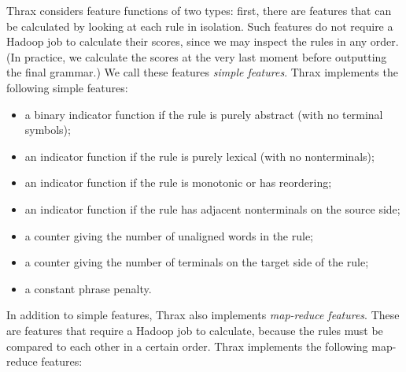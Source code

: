\documentclass[11pt]{article}
\begin{document}
Thrax considers feature functions of two types: first, there are features that can be calculated by looking at each rule in isolation. Such features do not require a Hadoop job to calculate their scores, since we may inspect the rules in any order. (In practice, we calculate the scores at the very last moment before outputting the final grammar.) We call these features {\em simple features}. Thrax implements the following simple features:
\begin{itemize}
\item a binary indicator function if the rule is purely abstract (with no terminal symbols);
\item an indicator function if the rule is purely lexical (with no nonterminals);
\item an indicator function if the rule is monotonic or has reordering;
\item an indicator function if the rule has adjacent nonterminals on the source side;
\item a counter giving the number of unaligned words in the rule;
\item a counter giving the number of terminals on the target side of the rule;
\item a constant phrase penalty.
\end{itemize}
In addition to simple features, Thrax also implements {\em map-reduce features}. These are features that require a Hadoop job to calculate, because the rules must be compared to each other in a certain order. Thrax implements the following map-reduce features:
\end{document}

